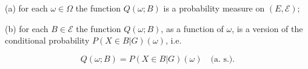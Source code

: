 (a) for each $\omega \in \Omega$ the function $Q(\omega; B)$ is a probability measure on $(E, \mathcal{E})$;

(b) for each $B \in \mathcal{E}$ the function $Q(\omega; B)$, as a function of $\omega$, is a version of the conditional probability $P(X \in B | G)(\omega)$, i.e.

$$Q(\omega; B) = P(X \in B | G)(\omega) \quad \text{(a. s.)}.$$
